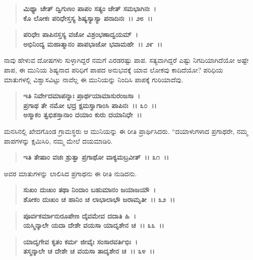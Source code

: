 \begin{verse}
\textbf{ಮಿಥ್ಯಾ ಚೇತ್ ದ್ವಿಗುಣಂ ಪಾಪಂ ಸತ್ಯಂ ಚೇತ್ ಸಮಭಾಗಿನಃ~।}\\\textbf{ಕೊ ಲೋಕಃ ಪರಿಧೇಸ್ತಸ್ಯ ಶಿಷ್ಯಸ್ಯಾಸ್ಯಾ ಪನಾದಿನಃ~।। ೨೮~।। }
\end{verse}

\begin{verse}
\textbf{ಪರಿಧೇಃ ಪಾಪಿನಸ್ತಸ್ಯ ವಚೋ ವಿಶ್ರಂಭಣಾದ್ವಯಮ್~।}\\\textbf{ಅಭಿನಿಂದ್ಯ ಮಹಾತ್ಮಾನಂ ಪಾಪಭಾಜೋ ಭವಾಮಹೇ~।। ೨೯~।।}
\end{verse}

ನಾವು ಹೇಳುವ ದೋಷಗಳು ಸುಳ್ಳಾಗಿದ್ದರೆ ನಮಗೆ ಎರಡರಷ್ಟು ಪಾಪ. ಸತ್ಯವಾಗಿದ್ದರೆ ಎಷ್ಟು ನಿಗದಿಯಾಗಿದೆಯೋ ಅಷ್ಟೇ ಪಾಪ, ಈ ಮುನಿಯ ಶಿಷ್ಯನಾದ ಪರಿಧಿಗೆ ಪಾಪದ ಅನುಭವಕ್ಕೆ ಯಾವ ಲೋಕವು ಕಾದಿದೆಯೋ? ಪರಿಧಿಯ ಮಾತುಗಳಲ್ಲಿ ವಿಶ್ವಾಸವಿಟ್ಟು ನಾವೆಲ್ಲ ಈ ಮುನಿಯನ್ನು ನಿಂದಿಸಿ ಪಾಪಕ್ಕೆ ಗುರಿಯಾದೆವು.

\begin{verse}
\textbf{ಇತಿ ನಿರ್ವೇದಮಾಪನ್ನಾಃ ಪ್ರಾರ್ಥಯಾಮಾಸುರಂಜಸಾ~।}\\\textbf{ಪ್ರಗಾಥ ತೇ ನಮೋ ಭದ್ರ ಕ್ಷಮಸ್ವಾಗಾಂಸಿ ಪಾಪಿನಃ~।। ೩೦~।।}\\\textbf{ಅಸ್ಮಾಕಂ ತ್ವಭಿಶಸ್ತಾನಾಂ ದಯಾಂ ಕುರು ದಯಾನಿಧೇ~।।}
\end{verse}

ಮನಸಿನಲ್ಲಿ ಖೇದಗೊಂಡ ಗ್ರಾಮಸ್ಥರು ಆ ಮುನಿಯನ್ನು ಈ ರೀತಿ ಪ್ರಾರ್ಥಿಸಿದರು. “ದಯಾಳುಗಳಾದ ಪ್ರಗಾಥರೇ, ನಮ್ಮ ಪಾಪಗಳನ್ನು ಕ್ಷಮಿಸಿರಿ, ನಮ್ಮ ಮೇಲೆ ದಯಮಾಡಿರಿ.

\begin{verse}
\textbf{ಇತಿ ತೇಷಾಂ ವಚಃ ಶ್ರುತ್ವಾ ಪ್ರಗಾಥೋ ವಾಕ್ಯಮಬ್ರವೀತ್~।। ೩೧~।।}
\end{verse}

ಅವರ ಮಾತುಗಳನ್ನು ಲಾಲಿಸಿದ ಪ್ರಗಾಥನು ಈ ರೀತಿ ನುಡಿದನು.

\begin{verse}
\textbf{ಸುಖಂ ದುಃಖಂ ತಥಾ ನಿಂದಾಂ ಬಹುಮಾನಂ ಜಯಾಜಯೌ~।}\\\textbf{ಶೋಕಂ ದುಃಖಂ ಚ ಹಾನಿಂ ಚ ಲಾಭಾಲಾಭೌ ಜರಾಮೃತೀ~।। ೩೨~।।}
\end{verse}

\begin{verse}
\textbf{ಪೂರ್ವಕರ್ಮಾನುರೂಪೇಣ ದೈವಮೇವ ದದಾತಿ ಹಿ~।}\\\textbf{ಯಸ್ಮಿನ್ಕಾಲೇ ಯದಾ ದೇಶೇ ವಯಸಾ ಯಾದೃಶೇನ ಚ~।। ೩೩~।।}
\end{verse}

\begin{verse}
\textbf{ಯಾದೃಗೇವ ಕೃತಂ ಕರ್ಮ ಜೀವೈಃ ಸಂಸಾರವರ್ತಿಭಿಃ~।}\\\textbf{ತಸ್ಮನ್ಕಾಲೇ ಚ ದೇಶೇ ಚ ವಯಸಾ ತಾದೃಶೇನ ಚ~।। ೩೪~।।}
\end{verse}

